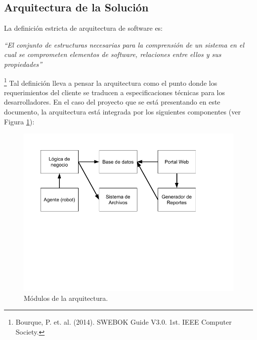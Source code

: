 \documentclass[a4paper,10pt]{article}
\begin{document}
\subsection{Arquitectura de la Solución}
La definición estricta de arquitectura de software es:
\begin{center}\textit{``El conjunto de estructuras necesarias para la comprensión de un sistema en el cual se comprometen elementos de software, relaciones entre ellos y sus propiedades''}\end{center}\footnote{Bourque, P. et. al. (2014). SWEBOK Guide V3.0. 1st. IEEE Computer Society.}
Tal definición lleva a pensar la arquitectura como el punto donde los requerimientos del cliente se traducen a especificaciones técnicas para los desarrolladores. En el caso del proyecto que se está presentando en este documento, la arquitectura está integrada por los siguientes componentes (ver Figura \ref{fig:dia-arq-comp}):
\begin{figure}[h]
\centering
\includegraphics[width=\textwidth]{dia-arq-comp} 
\caption{Módulos de la arquitectura.}
\label{fig:dia-arq-comp}
\end{figure}
\end{document}
